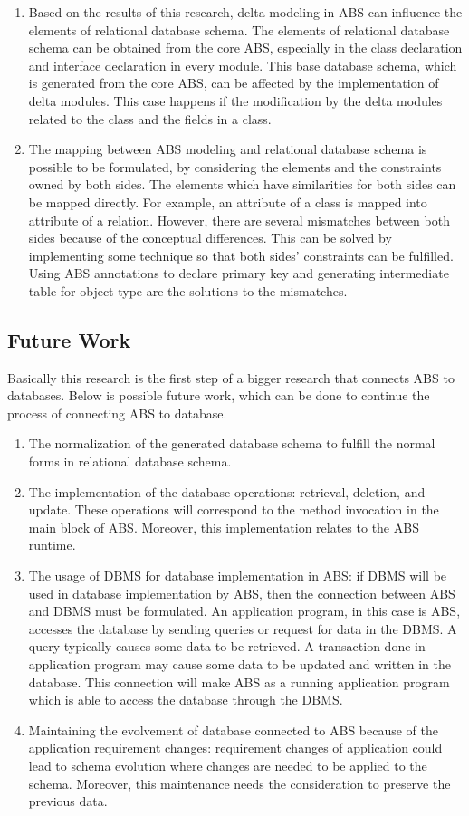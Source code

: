 \documentclass[conference]{IEEEtran}
\begin{document}
\begin{enumerate}
	\item Based on the results of this research, delta modeling in ABS can influence the elements of relational database schema.  The elements of relational database schema can be obtained from the core ABS, especially in the class declaration and interface declaration in every module. This base database schema, which is generated from the core ABS, can be affected by the implementation of delta modules. This case happens if the modification by the delta modules related to the class and the fields in a class.
	\item The mapping between ABS modeling and relational database schema is possible to be formulated, by considering the elements and the constraints owned by both sides. The elements which have similarities for both sides can be mapped directly. For example, an attribute of a class is mapped into attribute of a relation. However, there are several mismatches between both sides because of the conceptual differences. This can be solved by implementing some technique so that both sides’ constraints can be fulfilled. Using ABS annotations to declare primary key and generating intermediate table for object type are the solutions to the mismatches.
\end{enumerate}

\subsection{Future Work}
Basically this research is the first step of a bigger research that connects ABS to databases. Below is possible future work, which can be done to continue the process of connecting ABS to database.

\begin{enumerate}
	\item The normalization of the generated database schema to fulfill the normal forms in relational database schema.
	\item The implementation of the database operations: retrieval, deletion, and update. These operations will correspond to the method invocation in the main block of ABS. Moreover, this implementation relates to the ABS runtime.
	\item The usage of DBMS for database implementation in ABS: if DBMS will be used in database implementation by ABS, then the connection between ABS and DBMS must be formulated. An application program, in this case is ABS, accesses the database by sending queries or request for data in the DBMS. A query typically causes some data to be retrieved. A transaction done in application program may cause some data to be updated and written in the database. This connection will make ABS as a running application program which is able to access the database through the DBMS.
	\item Maintaining the evolvement of database connected to ABS because of the application requirement changes: requirement changes of application could lead to schema evolution where changes are needed to be applied to the schema. Moreover, this maintenance needs the consideration to preserve the previous data.
\end{enumerate}
\end{document}
